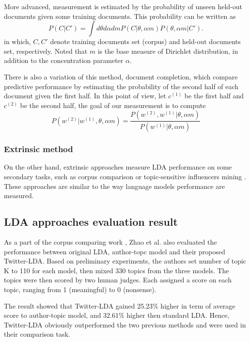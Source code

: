 \documentclass[conference,compsoc]{IEEEtran}
\begin{document}
More advanced, measurement is estimated by the probability of unseen held-out documents given some training documents. This probability can be written as \cite{Wallach2009a}
\[P(C|C')=\int d\theta d\alpha dm P(C|\theta,\alpha m)P(\theta,\alpha m|C').\]
in which, $C, C'$ denote training documents set (corpus) and held-out documents set, respectively. Noted that $m$ is the base measure of Dirichlet distribution, in addition to the concentration parameter $\alpha$.

There is also a variation of this method, document completion, which compare predictive performance by estimating the probability of the second half of each document given the first half. In this point of view, let $c^{(1)}$ be the first half and $c^{(2)}$ be the second half, the goal of our measurement is to compute
\[P(w^{(2)}|w^{(1)},\theta,\alpha m)=\frac{P(w^{(2)}, w^{(1)}|\theta,\alpha m)}{P(w^{(1)}|\theta,\alpha m)}\]

\subsubsection{Extrinsic method}

On the other hand, extrinsic approaches measure LDA performance on some secondary tasks, such as corpus comparison \cite{zhao2011comparing} or topic-sensitive influencers mining \cite{Weng2010}. These approaches are similar to the way language models performance are measured.

\subsection{LDA approaches evaluation result}

As a part of the corpus comparing work \cite{zhao2011comparing}, Zhao et al. also evaluated the performance between original LDA, author-topc model and their proposed Twitter-LDA. Based on preliminary experiments, the authors set number of topic K to 110 for each model, then mixed 330 topics from the three models. The topics were then scored by two human judges. Each assigned a score on each topic, ranging from 1 (meaningful) to 0 (nonsense).

The result showed that Twitter-LDA gained 25.23\% higher in term of average score to author-topic model, and 32.61\% higher then standard LDA. Hence, Twitter-LDA obviously outperformed the two previous methods and were used in their comparison task.
\end{document}
